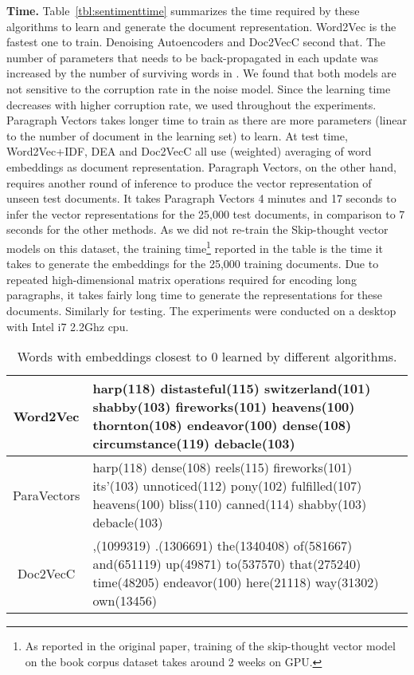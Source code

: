 \documentclass{article} \usepackage{iclr2017_conference,times}
\newcommand{\name}{Doc2VecC}
\begin{document}
\textbf{Time.} Table~\ref{tbl:sentimenttime} summarizes the time required by these algorithms to learn and generate the document representation. Word2Vec is the fastest one to train. Denoising Autoencoders and \name{} second that. The number of parameters that needs to be back-propagated in each update was increased by the number of surviving words in . We found that both models are not sensitive to the corruption rate  in the noise model. Since the learning time decreases with higher corruption rate, we used  throughout the experiments. Paragraph Vectors takes longer time to train as there are more parameters (linear to the number of document in the learning set) to learn. At test time, Word2Vec+IDF, DEA and \name{} all use (weighted) averaging of word embeddings as document representation. Paragraph Vectors, on the other hand, requires another round of inference to produce the vector representation of unseen test documents. It takes Paragraph Vectors 4 minutes and 17 seconds to infer the vector representations for the 25,000 test documents, in comparison to 7 seconds for the other methods. As we did not re-train the Skip-thought vector models on this dataset, the training time\footnote{As reported in the original paper, training of the skip-thought vector model on the book corpus dataset takes around 2 weeks on GPU.} reported in the table is the time it takes to generate the embeddings for the 25,000 training documents. Due to repeated high-dimensional matrix operations required for encoding long paragraphs, it takes fairly long time to generate the representations for these documents. Similarly for testing. The experiments were conducted on a desktop with Intel i7 2.2Ghz cpu.




\begin{table}
\caption{Words with embeddings closest to 0 learned by different algorithms. }
\label{tbl:adaptive}
\centering
\hspace{-0.1in}
\begin{tabular}{|c||p{12cm}|}
\hline
Word2Vec & harp(118) distasteful(115) switzerland(101) shabby(103) fireworks(101) heavens(100) thornton(108) endeavor(100) dense(108) circumstance(119) debacle(103) \\
\hline
ParaVectors  & harp(118) dense(108) reels(115) fireworks(101) its'(103) unnoticed(112) pony(102) fulfilled(107) heavens(100) bliss(110) canned(114) shabby(103) debacle(103) \\
\hline
\name &  ,(1099319) .(1306691) the(1340408) of(581667) and(651119) up(49871) to(537570) that(275240) time(48205) endeavor(100) here(21118) way(31302) own(13456)\\
\hline
\end{tabular}
\end{table}
\end{document}
